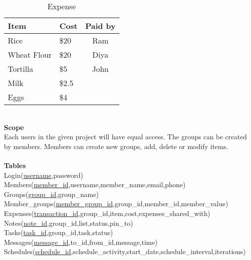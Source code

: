 \documentclass[11]{article}
\numberwithin{equation}{section}
\begin{document}
\begin{table}[h] %
\begin{center}
\caption{Expense }
	\begin{tabular}{| l | l | c |} %
	\hline
	Item & Cost & Paid by \\  %
	\hline
	Rice & \$20 & Ram \\  %
	\hline
		Wheat Flour & \$20 & Diya \\  %
	\hline
		Tortilla & \$5 & John \\  %
	\hline
		Milk & \$2.5 & \\  %
	\hline
		Eggs &  \$4 & \\  %
	\hline
	\end{tabular}
\end{center}
\end{table}
\fi
\ \\
\noindent \textbf{Scope} \\
Each users in the given project will have equal access. The groups can be created by members. Members can create new groups, add, delete or modify items. \\
\ \\
\noindent \textbf{Tables} \\
Login(\underline{username},password) \\
Members(\underline{member\_id},username,member\_name,email,phone) \\
Groups(\underline{group\_id},group\_name) \\
Member\_groups(\underline{member\_group\_id},group\_id,member\_id,member\_value) \\
Expenses(\underline{transaction\_id},group\_id,item,cost,expenses\_shared\_with) \\
Notes(\underline{note\_id},group\_id,list,status,pin\_to) \\
Tasks(\underline{task\_id},group\_id,task,status) \\
Messages(\underline{message\_id},to\_id,from\_id,message,time) \\
Schedules(\underline{schedule\_id},schedule\_activity,start\_date,schedule\_interval,iterations) \\
\end{document}
